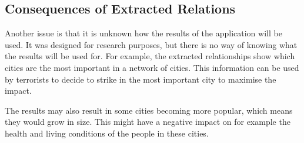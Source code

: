 \subsection{Consequences of Extracted Relations}
Another issue is that it is unknown how the results of the application will be used. It was designed for research purposes, but there is no way of knowing what the results will be used for. For example, the extracted relationships show which cities are the most important in a network of cities. This information can be used by terrorists to decide to strike in the most important city to maximise the impact. 

The results may also result in some cities becoming more popular, which means they would grow in size. This might have a negative impact on for example the health and living conditions of the people in these cities.


